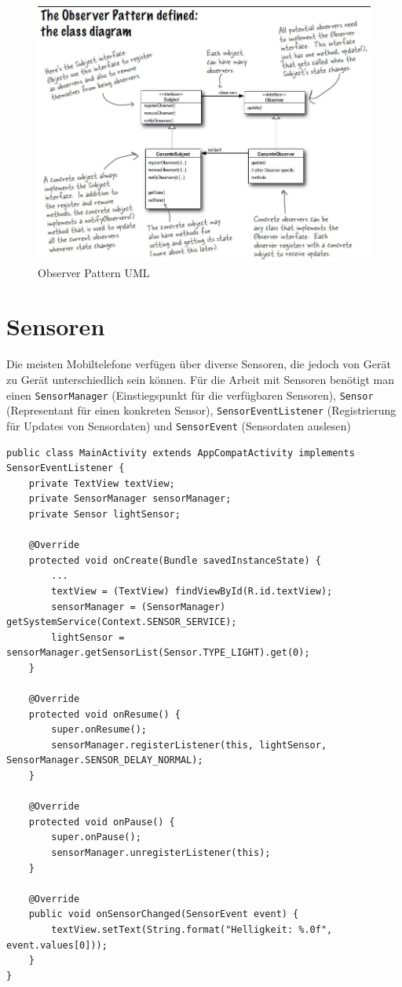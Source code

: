 \begin{figure}[h]
	\centering
	\includegraphics[width=0.8\linewidth]{images/observer}
	\caption{Observer Pattern UML}
	\label{fig:observer}
\end{figure}

\section{Sensoren}
Die meisten Mobiltelefone verfügen über diverse Sensoren, die jedoch von Gerät zu Gerät unterschiedlich sein können. Für die Arbeit mit Sensoren benötigt man einen \lstinline[]|SensorManager| (Einstiegspunkt für die verfügbaren Sensoren), \lstinline[]|Sensor| (Representant für einen konkreten Sensor), \lstinline[]|SensorEventListener| (Registrierung für Updates von Sensordaten) und \lstinline[]|SensorEvent| (Sensordaten auslesen)
\begin{lstlisting}[caption=Android Testing Erweiterung im build.gradle]
public class MainActivity extends AppCompatActivity implements SensorEventListener {
	private TextView textView;
	private SensorManager sensorManager;
	private Sensor lightSensor;
	
	@Override
	protected void onCreate(Bundle savedInstanceState) {
		...
		textView = (TextView) findViewById(R.id.textView);
		sensorManager = (SensorManager) getSystemService(Context.SENSOR_SERVICE);
		lightSensor = sensorManager.getSensorList(Sensor.TYPE_LIGHT).get(0);
	}
	
	@Override
	protected void onResume() {
		super.onResume();
		sensorManager.registerListener(this, lightSensor, SensorManager.SENSOR_DELAY_NORMAL);
	}
	
	@Override
	protected void onPause() {
		super.onPause();
		sensorManager.unregisterListener(this);
	}
	
	@Override
	public void onSensorChanged(SensorEvent event) {
		textView.setText(String.format("Helligkeit: %.0f", event.values[0]));
	}
}
\end{lstlisting}

